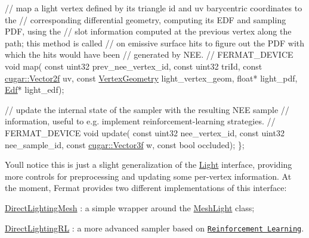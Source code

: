 \begin{DoxyParagraph}{}
\begin{DoxyEnumerate}
\begin{DoxyCode}
  \textcolor{comment}{// map a light vertex defined by its triangle id and uv barycentric coordinates to the}
  \textcolor{comment}{// corresponding differential geometry, computing its EDF and sampling PDF, using the}
  \textcolor{comment}{// slot information computed at the previous vertex along the path; this method is called}
  \textcolor{comment}{// on emissive surface hits to figure out the PDF with which the hits would have been}
  \textcolor{comment}{// generated by NEE.}
  \textcolor{comment}{//}
  FERMAT\_DEVICE
  \textcolor{keywordtype}{void} map(
      \textcolor{keyword}{const} uint32            prev\_nee\_vertex\_id,
      \textcolor{keyword}{const} uint32            triId,
      \textcolor{keyword}{const} \hyperlink{structcugar_1_1_vector}{cugar::Vector2f}   uv,
      \textcolor{keyword}{const} \hyperlink{struct_vertex_geometry}{VertexGeometry}    light\_vertex\_geom,
      \textcolor{keywordtype}{float}*                  light\_pdf,
      \hyperlink{struct_edf}{Edf}*                    light\_edf);

  \textcolor{comment}{// update the internal state of the sampler with the resulting NEE sample}
  \textcolor{comment}{// information, useful to e.g. implement reinforcement-learning strategies.}
  \textcolor{comment}{//}
  FERMAT\_DEVICE
  \textcolor{keywordtype}{void} update(
      \textcolor{keyword}{const} uint32            nee\_vertex\_id,
      \textcolor{keyword}{const} uint32            nee\_sample\_id,
      \textcolor{keyword}{const} \hyperlink{structcugar_1_1_vector}{cugar::Vector3f}   w,
      \textcolor{keyword}{const} \textcolor{keywordtype}{bool}              occluded);
\};
\end{DoxyCode}
 
\end{DoxyEnumerate}
\end{DoxyParagraph}
\begin{DoxyParagraph}{}
You\textquotesingle{}ll notice this is just a slight generalization of the \hyperlink{struct_light}{Light} interface, providing more controls for preprocessing and updating some per-\/vertex information. At the moment, Fermat provides two different implementations of this interface\+: ~\newline

\begin{DoxyItemize}
\item \hyperlink{struct_direct_lighting_mesh}{Direct\+Lighting\+Mesh} \+: a simple wrapper around the \hyperlink{struct_mesh_light}{Mesh\+Light} class;
\item \hyperlink{struct_direct_lighting_r_l}{Direct\+Lighting\+RL} \+: a more advanced sampler based on \href{https://en.wikipedia.org/wiki/Reinforcement_learning}{\tt Reinforcement Learning}.
\end{DoxyItemize}
\end{DoxyParagraph}
